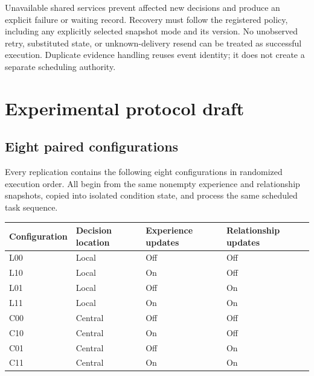 \documentclass[
  english,
  11pt,
]{article}
\newcounter{none} %
\begin{document}
Unavailable shared services prevent affected new decisions and produce
an explicit failure or waiting record. Recovery must follow the
registered policy, including any explicitly selected snapshot mode and
its version. No unobserved retry, substituted state, or unknown-delivery
resend can be treated as successful execution. Duplicate evidence
handling reuses event identity; it does not create a separate scheduling
authority.

\section{Experimental protocol draft}\label{experimental-protocol-draft}

\subsection{Eight paired
configurations}\label{eight-paired-configurations}

Every replication contains the following eight configurations in
randomized execution order. All begin from the same nonempty experience
and relationship snapshots, copied into isolated condition state, and
process the same scheduled task sequence.

{\def\LTcaptype{none} %
\begin{longtable}[]{@{}
  >{\raggedright\arraybackslash}p{}
  >{\raggedright\arraybackslash}p{}
  >{\raggedright\arraybackslash}p{}
  >{\raggedright\arraybackslash}p{}@{}}
\toprule\noalign{}
\begin{minipage}[b]{\linewidth}\raggedright
Configuration
\end{minipage} & \begin{minipage}[b]{\linewidth}\raggedright
Decision location
\end{minipage} & \begin{minipage}[b]{\linewidth}\raggedright
Experience updates
\end{minipage} & \begin{minipage}[b]{\linewidth}\raggedright
Relationship updates
\end{minipage} \\
\midrule\noalign{}
\endhead
\bottomrule\noalign{}
\endlastfoot
L00 & Local & Off & Off \\
L10 & Local & On & Off \\
L01 & Local & Off & On \\
L11 & Local & On & On \\
C00 & Central & Off & Off \\
C10 & Central & On & Off \\
C01 & Central & Off & On \\
C11 & Central & On & On \\
\end{longtable}
}
\end{document}
